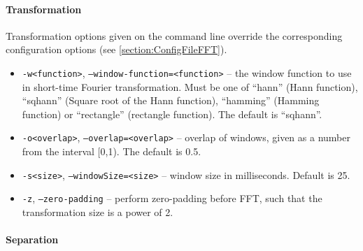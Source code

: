 \paragraph{Transformation}

Transformation options given on the command line override the corresponding 
configuration options (see \ref{section:ConfigFileFFT}).

\begin{itemize}
  \item {\tt -w<function>}, {\tt --window-function=<function>} -- the window
    function to use in short-time Fourier transformation. Must be one of
    ``hann'' (Hann function), ``sqhann'' (Square root of the Hann
    function), ``hamming'' (Hamming function) or ``rectangle'' (rectangle
    function). The default is ``sqhann''.
  \item {\tt -o<overlap>}, {\tt --overlap=<overlap>} -- overlap of windows,
    given as a number from the interval [0,1). The default is 0.5.
  \item {\tt -s<size>}, {\tt --windowSize=<size>} -- window size in
    milliseconds. Default is 25.
  \item {\tt -z}, {\tt --zero-padding} -- perform zero-padding before FFT,
    such that the transformation size is a power of 2.
\end{itemize}

\paragraph{Separation}

